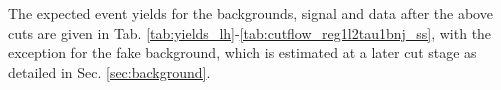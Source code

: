 
The expected event yields for the backgrounds, signal and data after the above cuts are given in Tab. \ref{tab:yields_lh}-\ref{tab:cutflow_reg1l2tau1bnj_ss}, with the exception for the fake background, which is estimated at a later cut stage as detailed in Sec. \ref{sec:background}.

